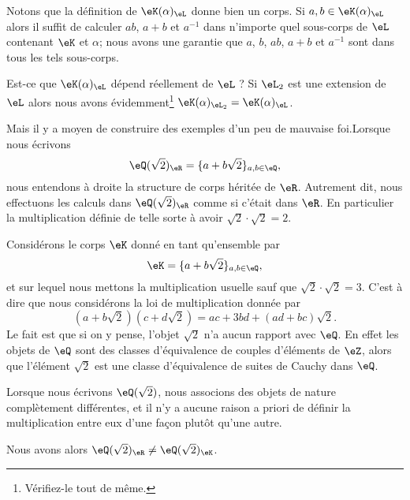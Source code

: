 Notons que la définition de \( \eK(\alpha)_{\eL}\) donne bien un corps. Si \( a,b\in \eK(\alpha)_{\eL}\) alors il suffit de calculer \( ab\), \( a+b\) et \( a^{-1}\) dans n'importe quel sous-corps de \( \eL\) contenant \( \eK\) et \( \alpha\); nous avons une garantie que \( a\), \( b\), \( ab  \), \( a+b\) et \( a^{-1}\) sont dans tous les tels sous-corps.

\begin{example}      \label{EXooJRSUooYhAZkR}
    Est-ce que \( \eK(\alpha)_{\eL}\) dépend réellement de \( \eL\) ? Si \( \eL_2\) est une extension de \( \eL\) alors nous avons évidemment\footnote{Vérifiez-le tout de même.} \( \eK(\alpha)_{\eL_2}=\eK(\alpha)_{\eL}\).

    Mais il y a moyen de construire des exemples d'un peu de mauvaise foi.Lorsque nous écrivons
    \begin{equation}
        \eQ(\sqrt{ 2 })_{\eR}=\{ a+b\sqrt{ 2 } \}_{a,b\in \eQ},
    \end{equation}
    nous entendons à droite la structure de corps héritée de \( \eR\). Autrement dit, nous effectuons les calculs dans \( \eQ(\sqrt{ 2 })_{\eR}\) comme si c'était dans \( \eR\). En particulier la multiplication définie de telle sorte à avoir \( \sqrt{ 2 }\cdot\sqrt{ 2 }=2 \).

    Considérons le corps \( \eK\) donné en tant qu'ensemble par
    \begin{equation}
        \eK=\{ a+b\sqrt{ 2 } \}_{a,b\in \eQ},
    \end{equation}
    et sur lequel nous mettons la multiplication usuelle sauf que \( \sqrt{ 2 }\cdot \sqrt{ 2 }=3\). C'est à dire que nous considérons la loi de multiplication donnée par
    \begin{equation}
        (a+b\sqrt{ 2 })(c+d\sqrt{ 2 })=ac+3bd+(ad+bc)\sqrt{ 2 }.
    \end{equation}
    Le fait est que si on y pense, l'objet \( \sqrt{ 2 }\) n'a aucun rapport avec \( \eQ\). En effet les objets de \( \eQ\) sont des classes d'équivalence de couples d'éléments de \( \eZ\), alors que l'élément \( \sqrt{ 2 }\) est une classe d'équivalence de suites de Cauchy dans \( \eQ\).

    Lorsque nous écrivons \( \eQ(\sqrt{ 2 })\), nous associons des objets de nature complètement différentes, et il n'y a aucune raison a priori de définir la multiplication entre eux d'une façon plutôt qu'une autre.

    Nous avons alors \( \eQ(\sqrt{ 2 })_{\eR}\neq \eQ(\sqrt{ 2 })_{\eK}\).
\end{example}

